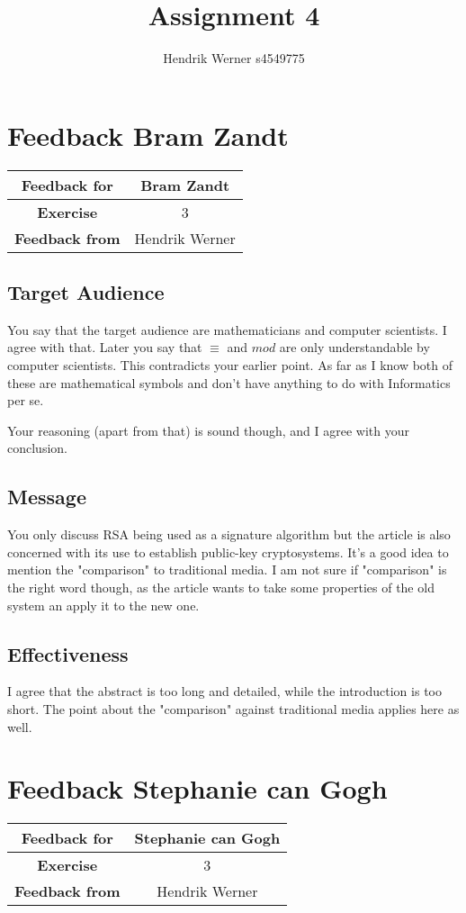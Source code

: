 \documentclass[12pt, a4paper]{article}
\title{Assignment 4}
\author{Hendrik Werner s4549775}
\begin{document}
\maketitle

\clearpage
\section{Feedback Bram Zandt}
\begin{tabular}{|c|c|}
	\hline
	\textbf{Feedback for} & Bram Zandt\\\hline
	\textbf{Exercise} & 3\\\hline
	\textbf{Feedback from} & Hendrik Werner\\\hline
\end{tabular}

\subsection{Target Audience}
You say that the target audience are mathematicians and computer scientists. I agree with that. Later you say that $\equiv$ and $mod$ are only understandable by computer scientists. This contradicts your earlier point. As far as I know both of these are mathematical symbols and don't have anything to do with Informatics per se.

Your reasoning (apart from that) is sound though, and I agree with your conclusion.

\subsection{Message}
You only discuss RSA being used as a signature algorithm but the article is also concerned with its use to establish public-key cryptosystems. It's a good idea to mention the "comparison" to traditional media. I am not sure if "comparison" is the right word though, as the article wants to take some properties of the old system an apply it to the new one.

\subsection{Effectiveness}
I agree that the abstract is too long and detailed, while the introduction is too short. The point about the "comparison" against traditional media applies here as well.

\clearpage
\section{Feedback Stephanie can Gogh}
\begin{tabular}{|c|c|}
	\hline
	\textbf{Feedback for} & Stephanie can Gogh\\\hline
	\textbf{Exercise} & 3\\\hline
	\textbf{Feedback from} & Hendrik Werner\\\hline
\end{tabular}
\end{document}

